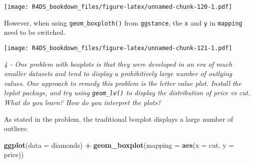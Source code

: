 \documentclass[]{article}
\newenvironment{Shaded}{\begin{snugshade}}{\end{snugshade}}
\newcommand{\KeywordTok}[1]{\textcolor[rgb]{0.13,0.29,0.53}{\textbf{#1}}}
\newcommand{\DataTypeTok}[1]{\textcolor[rgb]{0.13,0.29,0.53}{#1}}
\newcommand{\DecValTok}[1]{\textcolor[rgb]{0.00,0.00,0.81}{#1}}
\newcommand{\StringTok}[1]{\textcolor[rgb]{0.31,0.60,0.02}{#1}}
\newcommand{\OperatorTok}[1]{\textcolor[rgb]{0.81,0.36,0.00}{\textbf{#1}}}
\newcommand{\NormalTok}[1]{#1}
\theoremstyle{definition}
\theoremstyle{definition}
\theoremstyle{definition}
\theoremstyle{remark}
\begin{document}
\texttt{[image: R4DS\_bookdown\_files/figure-latex/unnamed-chunk-120-1.pdf]}

However, when using \texttt{geom\_boxploth()} from \texttt{ggstance},
the \texttt{x} and \texttt{y} in \texttt{mapping} need to be switched.

\begin{Shaded}
\end{Shaded}

\texttt{[image: R4DS\_bookdown\_files/figure-latex/unnamed-chunk-121-1.pdf]}

\emph{4 - One problem with boxplots is that they were developed in an
era of much smaller datasets and tend to display a prohibitively large
number of outlying values. One approach to remedy this problem is the
letter value plot. Install the lvplot package, and try using
\texttt{geom\_lv()} to display the distribution of price vs cut. What do
you learn? How do you interpret the plots?}

As stated in the problem, the traditional boxplot displays a large
number of outliers:

\begin{Shaded}
\begin{Highlighting}[]
\KeywordTok{ggplot}\NormalTok{(}\DataTypeTok{data =}\NormalTok{ diamonds) }\OperatorTok{+}
\StringTok{  }\KeywordTok{geom_boxplot}\NormalTok{(}\DataTypeTok{mapping =} \KeywordTok{aes}\NormalTok{(}\DataTypeTok{x =}\NormalTok{ cut, }\DataTypeTok{y =}\NormalTok{ price))}
\end{Highlighting}
\end{Shaded}
\end{document}
